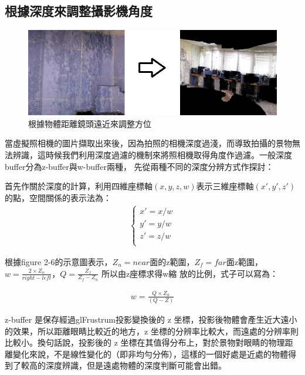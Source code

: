\subsection{根據深度來調整攝影機角度}
%

	\begin{figure}
	\begin{center}
	  \includegraphics[width=1.0\textwidth]{figures/Depth_Filter.jpg}
	  \caption{根據物體距離鏡頭遠近來調整方位}
	  \label{fig:Depth_Filter}
	\end{center}
	\end{figure}

	當虛擬照相機的圖片擷取出來後，因為拍照的相機深度過淺，而導致拍攝的景物無法辨識，這時候我們利用深度過濾的機制來將照相機取得角度作過濾。一般深度buffer分為z-buffer與w-buffer兩種，
	先從兩種不同的深度分辨方式作探討：
	
	首先作關於深度的計算，利用四維座標軸$(x,y,z,w)$表示三維座標軸$(x',y',z')$的點，空間關係的表示法為：
	\begin{align}
		\left\{
		\begin{array}{ccc}
		x' = x /w \\
		y' = y /w \\
		z' = z /w \\
		\end{array}
		\right.
	\end{align}
	
	根據figure 2-6的示意圖表示，$Z_n = near$面的z範圍，$Z_f = far$面z範圍，$w = \frac{2 \times Z_n}{right-left}$，$Q = \frac{Z_f}{Z_f - Z_n}$ 所以由z座標求得w縮
	放的比例，式子可以寫為：
		
	\begin{align}
		w = \frac{Q\times Z_n}{(Q-Z)}
	\end{align}			
	
	z-buffer 是保存經過glFrustrum投影變換後的 z 坐標，投影後物體會產生近大遠小的效果，所以距離眼睛比較近的地方，z 坐標的分辨率比較大，而遠處的分辨率則比較小。換句話說，投影後的
    z 坐標在其值得分布上，對於景物對眼睛的物理距離變化來說，不是線性變化的（即非均勻分佈），這樣的一個好處是近處的物體得到了較高的深度辨識，但是遠處物體的深度判斷可能會出錯。 
    
